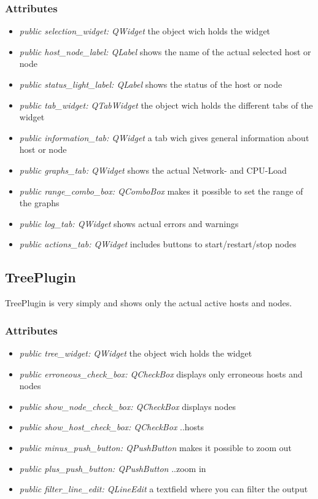 \subsubsection{Attributes}
\begin{itemize}
  \item \textit{public selection\_widget: QWidget}
  the object wich holds the widget
  \item \textit{public host\_node\_label: QLabel}
  shows the name of the actual selected host or node
  \item \textit{public status\_light\_label: QLabel}
  shows the status of the host or node
  \item \textit{public tab\_widget: QTabWidget}
  the object wich holds the different tabs of the widget
  \item \textit{public information\_tab: QWidget}
  a tab wich gives general information about host or node 
  \item \textit{public graphs\_tab: QWidget}
  shows the actual Network- and CPU-Load
  \item \textit{public range\_combo\_box: QComboBox}
  makes it possible to set the range of the graphs
  \item \textit{public log\_tab: QWidget}
  shows actual errors and warnings
  \item \textit{public actions\_tab: QWidget}
  includes buttons to start/restart/stop nodes  
\end{itemize}

\subsection{TreePlugin}
TreePlugin is very simply and shows only the actual active hosts
and nodes.
\subsubsection{Attributes}
\begin{itemize}
  \item \textit{public tree\_widget: QWidget}
  the object wich holds the widget
  \item \textit{public erroneous\_check\_box: QCheckBox}
  displays only erroneous hosts and nodes
  \item \textit{public show\_node\_check\_box: QCheckBox}
  displays nodes
  \item \textit{public show\_host\_check\_box: QCheckBox}
  ..hosts
  \item \textit{public minus\_push\_button: QPushButton}
  makes it possible to zoom out
  \item \textit{public plus\_push\_button: QPushButton}
  ..zoom in
  \item \textit{public filter\_line\_edit: QLineEdit}
  a textfield where you can filter the output
\end{itemize}

